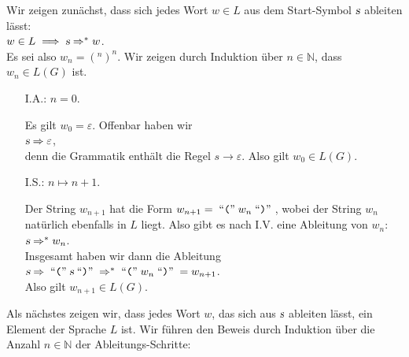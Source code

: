 \proof
Wir zeigen zun\"achst, dass sich jedes Wort $w \in L$ aus dem
Start-Symbol $\textsl{s}$ ableiten l\"asst:
\\[0.2cm]
\hspace*{1.3cm}
$w \in L \;\Longrightarrow\; \textsl{s} \Rightarrow^* w$.
\\[0.2cm]
Es sei also $w_n = (^n)^n$.  Wir zeigen durch Induktion \"uber $n \in \mathbb{N}$, dass $w_n \in L(G)$ ist.
\begin{enumerate}
\item[I.A.:] $n=0$.
  
            Es gilt $w_0 = \varepsilon$.  Offenbar haben wir
            \\[0.2cm]
            \hspace*{1.3cm}
            $\textsl{s} \Rightarrow \varepsilon$,
            \\[0.2cm]
            denn die Grammatik enth\"alt die Regel $s \rightarrow \varepsilon$.
            Also gilt $w_0 \in L(G)$.
\item[I.S.:] $n \mapsto n + 1$. 

            Der String $w_{n+1}$ hat die Form $w_{n+1} = \;\mbox{``\texttt{(}''}\;w_n\;\mbox{``\texttt{)}''}\;$, wobei
            der String $w_n$ nat\"urlich ebenfalls in $L$ liegt.
            Also gibt es nach I.V. eine Ableitung von $w_n$:
            \\[0.2cm]
            \hspace*{1.3cm}
            $\textsl{s} \Rightarrow^* w_n$.
            \\[0.2cm]
            Insgesamt haben wir dann die Ableitung
            \\[0.2cm]
            \hspace*{1.3cm}
            $\textsl{s} \Rightarrow \;\mbox{``\texttt{(}''}\;\textsl{s}\;\mbox{``\texttt{)}''}\; \Rightarrow^* \;\mbox{``\texttt{(}''}\; w_n \;\mbox{``\texttt{)}''}\; = w_{n+1}$.
            \\[0.2cm]
            Also gilt  $w_{n+1} \in L(G)$.
\end{enumerate}
Als n\"achstes zeigen wir, dass jedes Wort $w$, das sich aus $\textsl{s}$ ableiten l\"asst, ein Element
der Sprache $L$ ist.  Wir f\"uhren den Beweis durch Induktion \"uber die Anzahl $n \in \mathbb{N}$ der
Ableitungs-Schritte:
